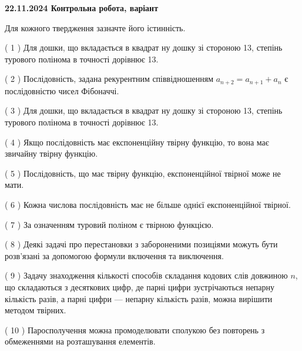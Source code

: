 \documentclass[12pt, ukrainian]{article}
\begin{document}
\vspace{4mm}
\newpage
\begin {large}

\textbf{22.11.2024 Контрольна робота, варіант  }\par


{
Для кожного твердження зазначте його істинність.\par
\vspace{2mm}
( 1 ) Для дошки, що вкладається в квадрат ну дошку зі стороною 13, степінь турового полінома в точності дорівнює 13.%

( 2 ) Послідовність, задана рекурентним співвідношенням $a_{n+2}=a_{n+1}+a_{n}$ є послідовністю чисел Фібоначчі.%

( 3 ) Для дошки, що вкладається в квадрат ну дошку зі стороною 13, степінь турового полінома в точності дорівнює 13.%

( 4 ) Якщо послідовність має експоненційну твірну функцію, то вона має звичайну твірну функцію.%

( 5 ) Послідовність, що має твірну функцію, експоненційної твірної може не мати.%

( 6 ) Кожна числова послідовність має не більше однієї  експоненційної твірної.%

( 7 ) За означенням туровий поліном є твірною функцією.%

( 8 ) Деякі задачі про перестановки з забороненими позиціями можуть бути розв’я\-за\-ні за допомогою формули включення та виключення.%

( 9 ) Задачу знаходження кількості способів складання кодових слів довжиною $n$, що складаються з десяткових цифр, де парні цифри зустрічаються непарну кількість разів, а парні цифри — непарну кількість разів, можна вирішити методом твірних.%

( 10 ) Паросполучення можна промоделювати сполукою без повторень з обмеженнями на розташування елементів.%


\vspace{5mm}
}
\end {large}
\end{document}
